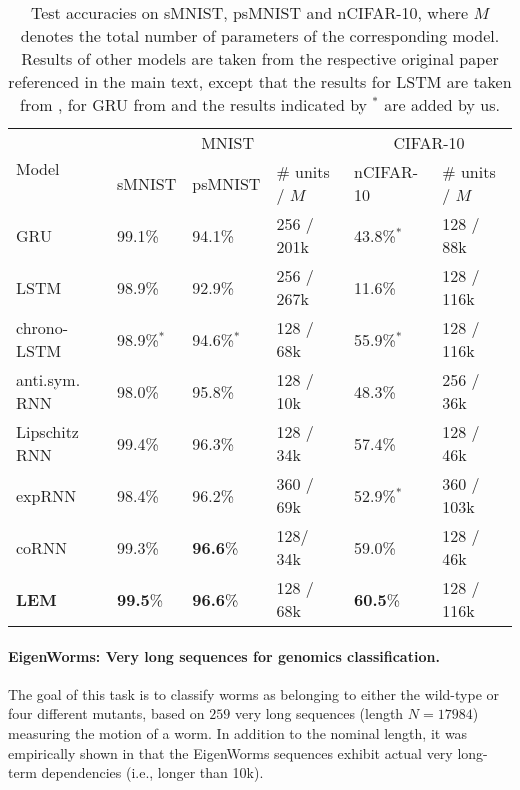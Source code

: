 \documentclass{article} \usepackage{iclr2022_conference,times}
\begin{document}
\begin{table}[ht!]
\caption{Test accuracies on sMNIST, psMNIST and nCIFAR-10, where $M$ denotes the total number of parameters of the corresponding model. Results of other models are taken from the respective original paper referenced in the main text, except that the results for LSTM are taken from \citet{scornn}, for GRU from \citet{GRU_results} and the results indicated by $^*$ are added by us.}
\label{tab:image}
\centering
\begin{tabular}{llllll}
\toprule
\cmidrule(r){1-6}
\multirow{2}{*}{Model} &  \multicolumn{3}{c}{MNIST} & \multicolumn{2}{c}{CIFAR-10} \\
\cmidrule(r){2-4}\cmidrule(r){5-6}  
& sMNIST & psMNIST &\# units / $M$ & nCIFAR-10 & \# units / $M$ \\
\midrule
GRU & 99.1\% & 94.1\% & 256 / 201k & 43.8\%$^*$& 128 / 88k\\
LSTM & 98.9\% & 92.9\% & 256 / 267k & 11.6\% & 128 / 116k \\
chrono-LSTM & 98.9\%$^*$ & 94.6\%$^*$ & 128 / 68k & 55.9\%$^*$ & 128 / 116k \\
anti.sym. RNN &  98.0\% & 95.8\% & 128 / 10k & 48.3\% & 256 / 36k\\
Lipschitz RNN & 99.4\% & 96.3\% & 128 / 34k & 57.4\% & 128 / 46k \\
expRNN &  98.4\% &  96.2\%& 360 / 69k & 52.9\%$^*$& 360 / 103k \\
coRNN & 99.3\% & \textbf{96.6}\% & 128/ 34k & 59.0\% & 128 / 46k\\
\textbf{LEM} & \textbf{99.5}\% & \textbf{96.6}\% & 128 / 68k & \textbf{60.5}\% & 128 / 116k\\
    \bottomrule
  \end{tabular}
\end{table}
\paragraph{EigenWorms: Very long sequences for genomics classification.}
The goal of this task \citep{eigenworms} is to classify worms as belonging to either the wild-type or four different mutants, based on $259$ very long sequences (length $N=17984$) measuring the motion of a worm. In addition to the nominal length, it was empirically shown in \citet{unicornn} that the EigenWorms sequences exhibit actual very long-term dependencies (i.e., longer than 10k). 
\end{document}
